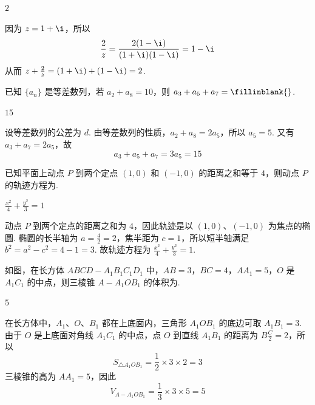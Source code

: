 \begin{answer}
\(2\)
\end{answer}

\begin{solution}
因为 \(z=1+\i\)，所以
\[
\frac2z=\frac{2(1-\i)}{(1+\i)(1-\i)}=1-\i
\]
从而 \(z+\frac2z=(1+\i)+(1-\i)=2\).
\end{solution}

\begin{problem}
已知 \(\{a_n\}\) 是等差数列，若 \(a_2+a_8=10\)，则 \(a_3+a_5+a_7=\fillinblank{}\).
\end{problem}

\begin{answer}
\(15\)
\end{answer}

\begin{solution}
设等差数列的公差为 \(d\). 由等差数列的性质，\(a_2+a_8=2a_5\)，所以 \(a_5=5\). 又有 \(a_3+a_7=2a_5\)，故
\[
a_3+a_5+a_7=3a_5=15
\]
\end{solution}

\begin{problem}
已知平面上动点 \(P\) 到两个定点 \((1,0)\) 和 \((-1,0)\) 的距离之和等于 \(4\)，则动点 \(P\) 的轨迹方程为\fillinblank{}.
\end{problem}

\begin{answer}
\(\frac{x^2}{4}+\frac{y^2}{3}=1\)
\end{answer}

\begin{solution}
动点 \(P\) 到两个定点的距离之和为 \(4\)，因此轨迹是以 \((1,0)\)、\((-1,0)\) 为焦点的椭圆. 椭圆的长半轴为 \(a=\frac{4}{2}=2\)，焦半距为 \(c=1\)，所以短半轴满足 \(b^2=a^2-c^2=4-1=3\). 故轨迹方程为 \(\frac{x^2}{4}+\frac{y^2}{3}=1\).
\end{solution}

\begin{problem}
如图，在长方体 \(ABCD-A_1B_1C_1D_1\) 中，\(AB=3\)，\(BC=4\)，\(AA_1=5\)，\(O\) 是 \(A_1C_1\) 的中点，则三棱锥 \(A-A_1OB_1\) 的体积为\fillinblank{}.

\end{problem}

\begin{answer}
\(5\)
\end{answer}

\begin{solution}
在长方体中，\(A_1\)、\(O\)、\(B_1\) 都在上底面内，三角形 \(A_1OB_1\) 的底边可取 \(A_1B_1=3\). 由于 \(O\) 是上底面对角线 \(A_1C_1\) 的中点，点 \(O\) 到直线 \(A_1B_1\) 的距离为 \(B\frac{C}{2}=2\)，所以
\[
S_{\triangle A_1OB_1}=\frac12\times3\times2=3
\]
三棱锥的高为 \(AA_1=5\)，因此
\[
V_{A-A_1OB_1}=\frac13\times3\times5=5
\]
\end{solution}

